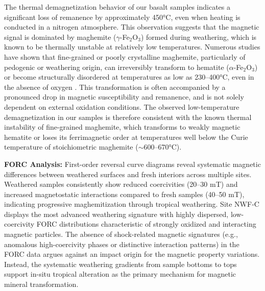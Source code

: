 \documentclass[twocolumn,11pt]{article}
\begin{document}
The thermal demagnetization behavior of our basalt samples indicates a significant loss of remanence by approximately 450°C, even when heating is conducted in a nitrogen atmosphere. This observation suggests that the magnetic signal is dominated by maghemite (\(\gamma\)-Fe\(_2\)O\(_3\)) formed during weathering, which is known to be thermally unstable at relatively low temperatures. Numerous studies have shown that fine-grained or poorly crystalline maghemite, particularly of pedogenic or weathering origin, can irreversibly transform to hematite (\(\alpha\)-Fe\(_2\)O\(_3\)) or become structurally disordered at temperatures as low as 230–400°C, even in the absence of oxygen \citep{Dunlop1997, Ozdemir1984, vanVelzen1993}. This transformation is often accompanied by a pronounced drop in magnetic susceptibility and remanence, and is not solely dependent on external oxidation conditions. The observed low-temperature demagnetization in our samples is therefore consistent with the known thermal instability of fine-grained maghemite, which transforms to weakly magnetic hematite or loses its ferrimagnetic order at temperatures well below the Curie temperature of stoichiometric maghemite (\(\sim\)600–670°C).

\textbf{FORC Analysis:} First-order reversal curve diagrams reveal systematic magnetic differences between weathered surfaces and fresh interiors across multiple sites. Weathered samples consistently show reduced coercivities (20--30 mT) and increased magnetostatic interactions compared to fresh samples (40--50 mT), indicating progressive maghemitization through tropical weathering. Site NWF-C displays the most advanced weathering signature with highly dispersed, low-coercivity FORC distributions characteristic of strongly oxidized and interacting magnetic particles. The absence of shock-related magnetic signatures (e.g., anomalous high-coercivity phases or distinctive interaction patterns) in the FORC data argues against an impact origin for the magnetic property variations. Instead, the systematic weathering gradients from sample bottoms to tops support in-situ tropical alteration as the primary mechanism for magnetic mineral transformation.
\end{document}
